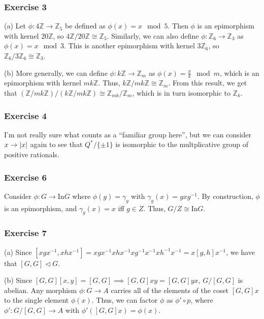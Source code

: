 \subsubsection{Exercise 3}
(a) Let $\phi: 4\mathbb{Z} \to \mathbb{Z}_5$ be defined as $\phi(x) = x \mod 5$. Then $\phi$ is an epimorphism
with kernel $20\mathbb{Z}$, so $4\mathbb{Z} / 20\mathbb{Z} \cong \mathbb{Z}_5$. Similarly, we can also
define $\phi: \mathbb{Z}_6 \to \mathbb{Z}_3$ as $\phi(x) = x \mod 3$. This is another epimorphism with
kernel $3\mathbb{Z}_6$, so $\mathbb{Z}_6 / 3\mathbb{Z}_6 \cong \mathbb{Z}_3$.

(b) More generally, we can define $\phi: k \mathbb{Z} \to \mathbb{Z}_m$ as $\phi(x) = \frac{x}{k} \mod m$, 
which is an epimorphism with kernel $m k  \mathbb{Z}$. Thus, $k\mathbb{Z} / m k \mathbb{Z} \cong \mathbb{Z}_m$.
From this result, we get that 
$(\mathbb{Z} /m k \mathbb{Z}) / (k\mathbb{Z} / m k \mathbb{Z}) \cong \mathbb{Z}_{m k} / \mathbb{Z}_m$, which
is in turn isomorphic to $\mathbb{Z}_k$.

\subsubsection{Exercise 4}
I'm not really sure what counts as a ``familiar group here'', but we can consider $x \to \abs{x}$ again to
see that $Q^* / \{\pm 1 \}$ is isomorphic to the multplicative group of positive rationals.

\subsubsection{Exercise 6}
Consider $\phi: G \to \text{In} G$ where $\phi(g) = \gamma_g$ with $\gamma_g(x) = gxg^{-1}$. By construction,
$\phi$ is an epimorphism, and $\gamma_g(x) = x$ iff $g \in Z$. Thus, $G / Z \cong \text{In} G$.

\subsubsection{Exercise 7}
(a) Since $[xgx^{-1}, xhx^{-1}] = x g x^{-1} x h x^{-1} x g^{-1} x^{-1} x h^{-1} x^{-1} = x[g, h]x^{-1}$, we
have that $[G, G] \triangleleft G$. 

(b) Since $[G, G] [x, y] = [G, G] \implies [G, G] xy = [G, G] yx$, $G / [G, G]$ is abelian. Any morphism
$\phi: G \to A$ carries all of the elements of the coset $[G, G]x$ to the single element $\phi(x)$. Thus,
we can factor $\phi$ as $\phi' \circ p$, where $\phi': G / [G, G] \to A$ with $\phi'([G, G]x) = \phi(x)$.

